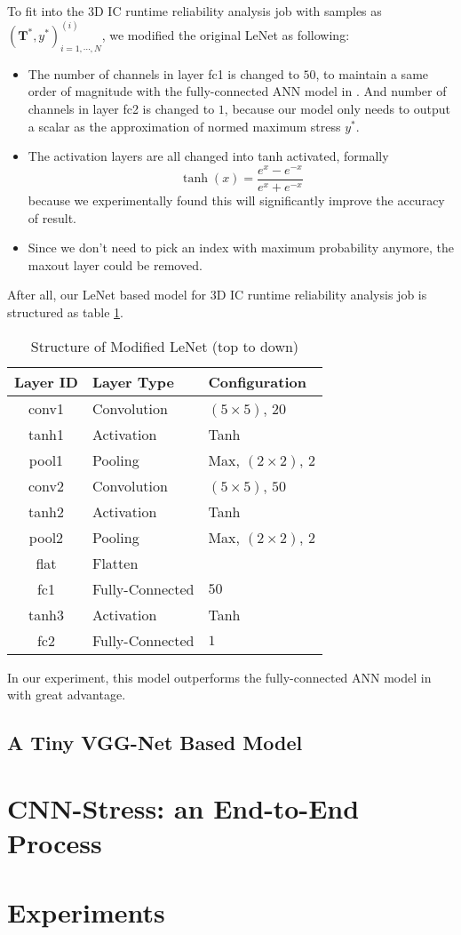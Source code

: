 To fit into the 3D IC runtime reliability analysis job with samples as 
$\left(\mathbf{T}^*, y^*\right)^{(i)}_{i=1,\cdots, N}$,
we modified the original LeNet as following:
\begin{itemize}
    \item The number of channels in layer fc1 is changed to $50$, to maintain a same order of magnitude
    with the fully-connected ANN model in \cite{Zhang2016Fast}. 
    And number of channels in layer fc2 is changed to $1$, because our model
    only needs to output a scalar as the approximation of normed maximum stress $y ^ *$.
    \item The activation layers are all changed into tanh activated, formally
    \begin{equation}
    \tanh (x) = \frac{e^x - e^{-x}}{e^x + e^{-x}}
    \end{equation}
    because we experimentally found this will significantly improve the accuracy of result.
    \item Since we don't need to pick an index with maximum probability anymore, the maxout
    layer could be removed.
\end{itemize}
After all, our LeNet based model for 3D IC runtime reliability analysis job is structured as table \ref{tab::LeNet'}.
\begin{table}[htb]
    \centering
    \begin{tabular}{cll}
        \toprule
        Layer ID & Layer Type & Configuration \\
        \midrule
        conv1 & Convolution & $\left(5\times5\right)$, $20$ \\
        tanh1  & Activation  & Tanh \\
        pool1 & Pooling     & Max, $\left(2\times2\right)$, $2$ \\
        conv2 & Convolution & $\left(5\times5\right)$, $50$ \\
        tanh2  & Activation  & Tanh \\
        pool2 & Pooling     & Max, $\left(2\times2\right)$, $2$ \\
        flat  & Flatten     & \\
        fc1   & Fully-Connected & $50$ \\
        tanh3  & Activation  & Tanh \\
        fc2   & Fully-Connected & $1$ \\
        \bottomrule
    \end{tabular}
    \caption{Structure of Modified LeNet (top to down)}
    \label{tab::LeNet'}
\end{table}
In our experiment, this model outperforms the fully-connected ANN model in \cite{Zhang2016Fast}
with great advantage.

\subsection{A Tiny VGG-Net Based Model}

\section{CNN-Stress: an End-to-End Process}

\section{Experiments}
